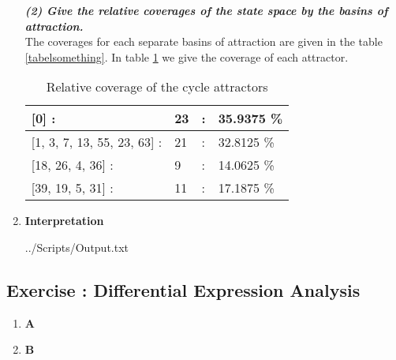 \documentclass[10pt,a4paper]{article}
\newcommand{\exercise}[1]
{
  \stepcounter{subsection}
  \subsection*{Exercise \thesubsection: #1}

}
\begin{document}
\begin{enumerate}
\textit{\textbf{(2) Give the relative coverages of the state space by the basins of attraction.}}\\
The coverages for each separate basins of attraction are given in the table \ref{tabelsomething}. In table \ref{covenant} we give the coverage of each attractor.
\begin{table}[H]
	\centering
	\caption{Relative coverage of the cycle attractors}
	\label{covenant}
	\begin{tabular}{|l|l|l|l|}
		\hline
		{[}0{]} :                       & 23 & : & 35.9375 \% \\ \hline
		{[}1, 3, 7, 13, 55, 23, 63{]} : & 21 & : & 32.8125 \% \\ \hline
		{[}18, 26, 4, 36{]} :           & 9  & : & 14.0625 \% \\ \hline
		{[}39, 19, 5, 31{]} :           & 11 & : & 17.1875 \% \\ \hline
	\end{tabular}
\end{table}

	








\newpage
\item \textbf{Interpretation}


\newpage
 {../Scripts/Output.txt}




\end{enumerate}






\newpage
\exercise{Differential Expression Analysis}
\begin{enumerate}
	
	\item \textbf{A}\\

	
	\item \textbf{B}\\
	
	
	
	
	
\end{enumerate}
\end{document}
